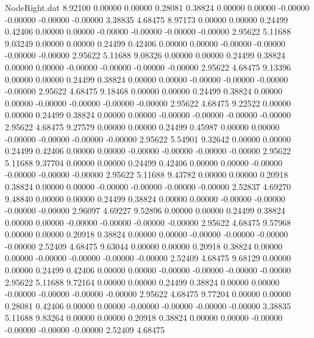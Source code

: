 \begin{filecontents}{NodeRight.dat}
   8.92100    0.00000    0.00000     0.28081    0.38824    0.00000    0.00000   -0.00000   -0.00000   -0.00000   -0.00000    3.38835    4.68475
   8.97173    0.00000    0.00000     0.24499    0.42406    0.00000    0.00000   -0.00000   -0.00000   -0.00000   -0.00000    2.95622    5.11688
   9.03249    0.00000    0.00000     0.24499    0.42406    0.00000    0.00000   -0.00000   -0.00000   -0.00000   -0.00000    2.95622    5.11688
   9.08326    0.00000    0.00000     0.24499    0.38824    0.00000    0.00000   -0.00000   -0.00000   -0.00000   -0.00000    2.95622    4.68475
   9.13396    0.00000    0.00000     0.24499    0.38824    0.00000    0.00000   -0.00000   -0.00000   -0.00000   -0.00000    2.95622    4.68475
   9.18468    0.00000    0.00000     0.24499    0.38824    0.00000    0.00000   -0.00000   -0.00000   -0.00000   -0.00000    2.95622    4.68475
   9.22522    0.00000    0.00000     0.24499    0.38824    0.00000    0.00000   -0.00000   -0.00000   -0.00000   -0.00000    2.95622    4.68475
   9.27579    0.00000    0.00000     0.24499    0.45987    0.00000    0.00000   -0.00000   -0.00000   -0.00000   -0.00000    2.95622    5.54901
   9.32642    0.00000    0.00000     0.24499    0.42406    0.00000    0.00000   -0.00000   -0.00000   -0.00000   -0.00000    2.95622    5.11688
   9.37704    0.00000    0.00000     0.24499    0.42406    0.00000    0.00000   -0.00000   -0.00000   -0.00000   -0.00000    2.95622    5.11688
   9.43782    0.00000    0.00000     0.20918    0.38824    0.00000    0.00000   -0.00000   -0.00000   -0.00000   -0.00000    2.52837    4.69270
   9.48840    0.00000    0.00000     0.24499    0.38824    0.00000    0.00000   -0.00000   -0.00000   -0.00000   -0.00000    2.96097    4.69227
   9.52896    0.00000    0.00000     0.24499    0.38824    0.00000    0.00000   -0.00000   -0.00000   -0.00000   -0.00000    2.95622    4.68475
   9.57968    0.00000    0.00000     0.20918    0.38824    0.00000    0.00000   -0.00000   -0.00000   -0.00000   -0.00000    2.52409    4.68475
   9.63044    0.00000    0.00000     0.20918    0.38824    0.00000    0.00000   -0.00000   -0.00000   -0.00000   -0.00000    2.52409    4.68475
   9.68129    0.00000    0.00000     0.24499    0.42406    0.00000    0.00000   -0.00000   -0.00000   -0.00000   -0.00000    2.95622    5.11688
   9.72164    0.00000    0.00000     0.24499    0.38824    0.00000    0.00000   -0.00000   -0.00000   -0.00000   -0.00000    2.95622    4.68475
   9.77204    0.00000    0.00000     0.28081    0.42406    0.00000    0.00000   -0.00000   -0.00000   -0.00000   -0.00000    3.38835    5.11688
   9.83264    0.00000    0.00000     0.20918    0.38824    0.00000    0.00000   -0.00000   -0.00000   -0.00000   -0.00000    2.52409    4.68475

\end{filecontents}
